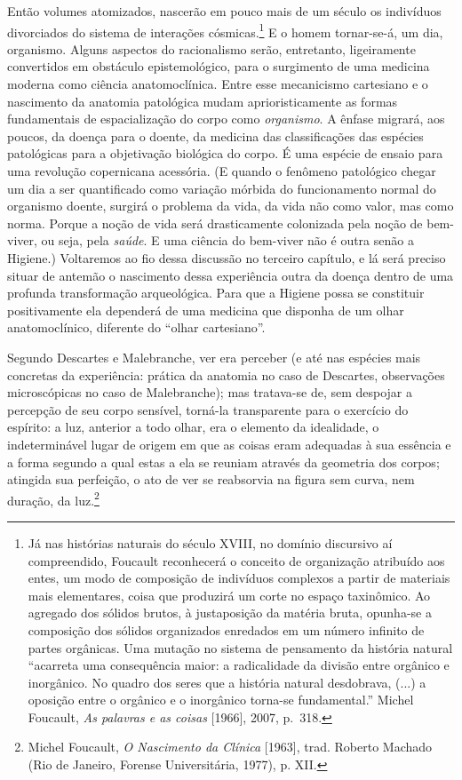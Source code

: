 Então volumes atomizados, nascerão em pouco mais de um século os
indivíduos divorciados do sistema de interações cósmicas.\footnote{Já
  nas histórias naturais do século XVIII, no domínio discursivo aí
  compreendido, Foucault reconhecerá o conceito de organização atribuído
  aos entes, um modo de composição de indivíduos complexos a partir de
  materiais mais elementares, coisa que produzirá um corte no espaço
  taxinômico. Ao agregado dos sólidos brutos, à justaposição da matéria
  bruta, opunha-se a composição dos sólidos organizados enredados em um
  número infinito de partes orgânicas. Uma mutação no sistema de
  pensamento da história natural ``acarreta uma consequência maior: a
  radicalidade da divisão entre orgânico e inorgânico. No quadro dos
  seres que a história natural desdobrava, (...) a oposição entre o
  orgânico e o inorgânico torna-se fundamental.'' Michel Foucault,
  \emph{As palavras e as coisas} {[}1966{]}, 2007, p.~318.} E o homem
tornar-se-á, um dia, organismo. Alguns aspectos do racionalismo serão,
entretanto, ligeiramente convertidos em obstáculo epistemológico, para o
surgimento de uma medicina moderna como ciência anatomoclínica. Entre
esse mecanicismo cartesiano e o nascimento da anatomia patológica mudam
aprioristicamente as formas fundamentais de espacialização do corpo como
\emph{organismo}. A ênfase migrará, aos poucos, da doença para o doente,
da medicina das classificações das espécies patológicas para a
objetivação biológica do corpo. É uma espécie de ensaio para uma
revolução copernicana acessória. (E quando o fenômeno patológico chegar
um dia a ser quantificado como variação mórbida do funcionamento normal
do organismo doente, surgirá o problema da vida, da vida não como valor,
mas como norma. Porque a noção de vida será drasticamente colonizada
pela noção de bem-viver, ou seja, pela \emph{saúde}. E uma ciência do
bem-viver não é outra senão a Higiene.) Voltaremos ao fio dessa
discussão no terceiro capítulo, e lá será preciso situar de antemão o
nascimento dessa experiência outra da doença dentro de uma profunda
transformação arqueológica. Para que a Higiene possa se constituir
positivamente ela dependerá de uma medicina que disponha de um olhar
anatomoclínico, diferente do ``olhar cartesiano''.

Segundo Descartes e Malebranche, ver era perceber (e até nas espécies
mais concretas da experiência: prática da anatomia no caso de Descartes,
observações microscópicas no caso de Malebranche); mas tratava-se de,
sem despojar a percepção de seu corpo sensível, torná-la transparente
para o exercício do espírito: a luz, anterior a todo olhar, era o
elemento da idealidade, o indeterminável lugar de origem em que as
coisas eram adequadas à sua essência e a forma segundo a qual estas a
ela se reuniam através da geometria dos corpos; atingida sua perfeição,
o ato de ver se reabsorvia na figura sem curva, nem duração, da
luz.\footnote{Michel Foucault, \emph{O Nascimento da Clínica}
  {[}1963{]}, trad. Roberto Machado (Rio de Janeiro, Forense
  Universitária, 1977), p. XII.}

